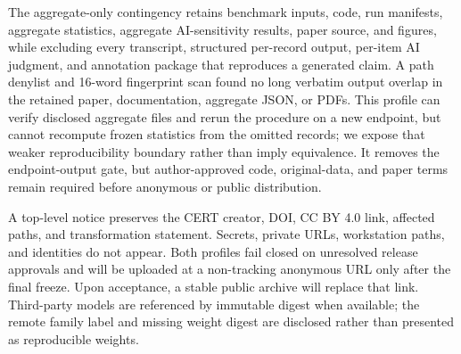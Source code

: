 \documentclass[letterpaper,twocolumn,10pt]{article}
\begin{document}
The aggregate-only contingency retains benchmark inputs, code, run manifests,
aggregate statistics, aggregate AI-sensitivity results, paper source, and
figures, while excluding every transcript, structured per-record output,
per-item AI judgment, and annotation package that reproduces a generated
claim.  A path denylist and 16-word fingerprint scan found no long verbatim
output overlap in the retained paper, documentation, aggregate JSON, or PDFs.
This profile can verify disclosed aggregate files and rerun the procedure on a
new endpoint, but cannot recompute frozen statistics from the omitted records;
we expose that weaker reproducibility boundary rather than imply equivalence.
It removes the endpoint-output gate, but author-approved code, original-data,
and paper terms remain required before anonymous or public distribution.

A top-level notice preserves the CERT creator, DOI, CC BY 4.0 link, affected
paths, and transformation statement.  Secrets, private URLs, workstation
paths, and identities do not appear.  Both profiles fail closed on unresolved
release approvals and will be uploaded at a non-tracking anonymous URL only
after the final freeze.  Upon acceptance, a stable public archive will replace
that link.  Third-party models are referenced by immutable digest when
available; the remote family label and missing weight digest are disclosed
rather than presented as reproducible weights.



\end{document}
